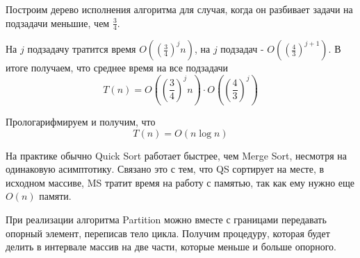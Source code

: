 \documentclass[../book.tex]{subfiles}
\begin{document}
	\begin{time}
		Построим дерево исполнения алгоритма для случая, когда он разбивает задачи на подзадачи меньшие, чем $\frac{3}{4}$.
		
		\begin{center}
		\end{center}
		
		На $j$ подзадачу тратится время $O((\frac{3}{4})^jn)$, на $j$ подзадач - $O((\frac{4}{3})^{j + 1})$. В итоге получаем, что среднее время на все подзадачи
		\[
		T(n) = 	O\left(
					\left(
						\frac{3}{4}
					\right)^jn
					\right)
				\cdot 
				O\left(
					\left(
						\frac{4}{3}
					\right)^j
				\right)
		\]
		
		Прологарифмируем и получим, что
		\[
		T(n) = O(n\log n)
		\]
	\end{time}
	
	На практике обычно Quick Sort работает быстрее, чем Merge Sort, несмотря на одинаковую асимптотику. Связано это с тем, что QS сортирует на месте, в исходном массиве, MS тратит время на работу с памятью, так как ему нужно еще $O(n)$ памяти.
	
	
	\begin{remark}
		При реализации алгоритма Partition можно вместе с границами передавать опорный элемент, переписав тело цикла. Получим процедуру, которая будет делить в интервале массив на две части, которые меньше и больше опорного.
	\end{remark}
	
\end{document}
